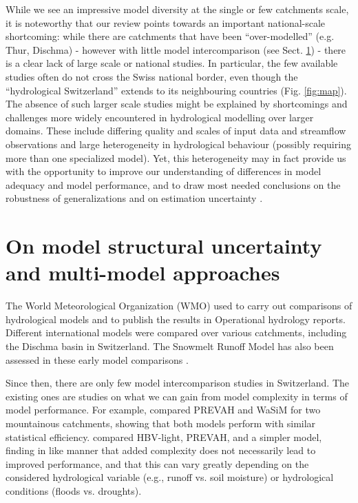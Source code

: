 \documentclass[10pt,a4paper]{article}
\begin{document}
While we see an impressive model diversity at the single or few catchments scale, it is noteworthy that our review points towards an important national-scale shortcoming: while there are catchments that have been ``over-modelled'' (e.g. Thur, Dischma) - however with little model intercomparison (see Sect. \ref{sec:multi-model}) - there is a clear lack of large scale or national studies. In particular, the few available studies often do not cross the Swiss national border, even though the ``hydrological Switzerland'' extends to its neighbouring countries (Fig. \ref{fig:map}). The absence of such larger scale studies might be explained by shortcomings and challenges more widely encountered in hydrological modelling over larger domains. These include differing quality and scales of input data and streamflow observations and large heterogeneity in hydrological behaviour (possibly requiring more than one specialized model). Yet, this heterogeneity may in fact provide us with the opportunity to improve our understanding of differences in model adequacy and model performance, and to draw most needed conclusions on the robustness of generalizations and on estimation uncertainty \citep{Gupta2014,McMillan2016}.


\section{On model structural uncertainty and multi-model approaches}
\label{sec:multi-model}

The World Meteorological Organization (WMO) used to carry out comparisons of hydrological models and to publish the results in Operational hydrology reports. Different international models were compared over various catchments, including the Dischma basin in Switzerland. The Snowmelt Runoff Model \citep[SRM,][see supplementary material]{Martinec1975} has also been assessed in these early model comparisons \citep{WMO1986, WMO1992a}.

Since then, there are only few model intercomparison studies in Switzerland. The existing ones are studies on what we can gain from model complexity in terms of model performance. For example, \citet{Gurtz2003} compared PREVAH and WaSiM for two mountainous catchments, showing that both models perform with similar statistical efficiency. \citet{Orth2015} compared HBV-light, PREVAH, and a simpler model, finding in like manner that added complexity does not necessarily lead to improved performance, and that this can vary greatly depending on the considered hydrological variable (e.g., runoff vs. soil moisture) or hydrological conditions (floods vs. droughts). 
\end{document}
